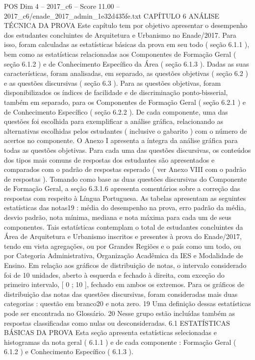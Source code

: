 \begin{textsample}{POS Dim 4 – 2017\_c6 – Score 11.00 – 2017\_c6/enade\_2017\_admin\_1e32d435fe.txt}  \label{ex:f4_pos_034}
CAPÍTULO 6 ANÁLISE TÉCNICA DA PROVA Este capítulo tem por objetivo apresentar o desempenho dos estudantes concluintes de Arquitetura e Urbanismo no Enade/2017.
Para isso, foram calculadas as estatísticas básicas da prova em seu todo ( seção 6.1.1 ), bem como as estatísticas relacionadas aos Componentes de Formação Geral ( seção 6.1.2 ) e de Conhecimento Específico da Área ( seção 6.1.3 ).
Dadas as suas características, foram analisadas, em separado, as questões objetivas ( seção 6.2 ) e as questões discursivas ( seção 6.3 ).
Para as questões objetivas, foram disponibilizados os índices de facilidade e de discriminação ponto-bisserial, também em separado, para os Componentes de Formação Geral ( seção 6.2.1 ) e de Conhecimento Específico ( seção 6.2.2 ).
De cada componente, uma das questões foi escolhida para exemplificar a análise gráfica, relacionando as alternativas escolhidas pelos estudantes ( inclusive o gabarito ) com o número de acertos no componente.
O Anexo I apresenta a íntegra da análise gráfica para todas as questões objetivas.
Para cada uma das questões discursivas, os conteúdos dos tipos mais comuns de respostas dos estudantes são apresentados e comparados com o padrão de respostas esperado ( ver Anexo VIII com o padrão de respostas ).
Tomando como base as duas questões discursivas do Componente de Formação Geral, a seção 6.3.1.6 apresenta comentários sobre a correção das respostas com respeito à Língua Portuguesa.
As tabelas apresentam as seguintes estatísticas das notas19 : média do desempenho na prova, erro padrão da média, desvio padrão, nota mínima, mediana e nota máxima para cada um de seus componentes.
Tais estatísticas contemplam o total de estudantes concluintes da Área de Arquitetura e Urbanismo inscritos e presentes à prova do Enade/2017, tendo em vista agregações, ou por Grandes Regiões e o país como um todo, ou por Categoria Administrativa, Organização Acadêmica da IES e Modalidade de Ensino.
Em relação aos gráficos de distribuição de notas, o intervalo considerado foi de 10 unidades, aberto à esquerda e fechado à direita, com exceção do primeiro intervalo, [ 0 ; 10 ], fechado em ambos os extremos.
Para os gráficos de distribuição das notas das questões discursivas, foram consideradas mais duas categorias : questão em branco20 e nota zero. 19 Uma definição dessas estatísticas pode ser encontrada no Glossário. 20 Nesse grupo estão incluídas também as respostas classificadas como nulas ou desconsideradas. 6.1 ESTATÍSTICAS BÁSICAS DA PROVA Esta seção apresenta estatísticas selecionadas e histogramas da nota geral ( 6.1.1 ) e de cada componente : Formação Geral ( 6.1.2 ) e Conhecimento Específico ( 6.1.3 ).

\end{textsample}

